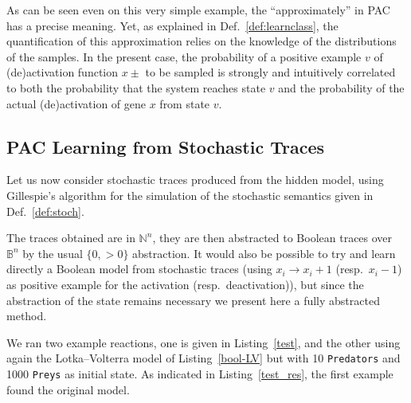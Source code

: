 \documentclass{llncs}
\newcommand{\lra}{\longrightarrow}
\begin{document}

As can be seen even on this very simple example, the ``approximately'' in PAC has a precise meaning. Yet, as explained in Def.~\ref{def:learnclass}, the quantification of this approximation relies on the knowledge of the distributions of the samples.
%
In the present case, the probability of a positive example $v$ of (de)activation function $x\pm$ to be sampled is strongly and intuitively correlated to both the probability that the system reaches state $v$ and the probability of the actual (de)activation of gene $x$ from state $v$. 


\subsection{PAC Learning from Stochastic Traces}

Let us now consider stochastic traces %
produced from the hidden model, using Gillespie's
algorithm for the simulation of the stochastic semantics given in
Def.~\ref{def:stoch}.

The traces obtained are in ${\mathbb{N}}^n$, they are then abstracted to
Boolean traces over ${\mathbb{B}}^n$ by the usual $\{0, >0\}$ abstraction.
It would also be possible to try and learn directly a Boolean model from
stochastic traces (using $x_i\lra x_i+1$ (resp.\ $x_i-1$) as positive example for the
activation (resp.\ deactivation)), but since the abstraction of the state
remains necessary we present here a fully abstracted method.



We ran two example reactions, one is given in Listing~\ref{test}, and the
other using again the Lotka--Volterra model of Listing~\ref{bool-LV} but with 10
\texttt{Predators} and 1000 \texttt{Preys} as initial state.
As indicated in Listing~\ref{test_res}, the first example found the original
model.
\end{document}
